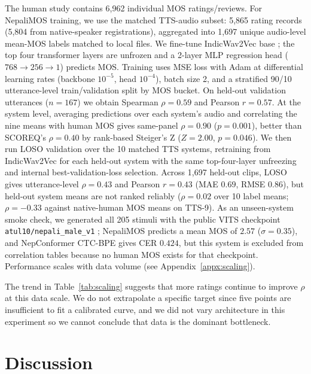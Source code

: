 \documentclass[11pt]{article}
\begin{document}
The human study contains 6{,}962 individual MOS ratings/reviews. For NepaliMOS training, we use the matched TTS-audio subset: 5{,}865 rating records (5{,}804 from native-speaker registrations), aggregated into 1{,}697 unique audio-level mean-MOS labels matched to local files. We fine-tune IndicWav2Vec base \citep{javed2022indicwav2vec}; the top four transformer layers are unfrozen and a 2-layer MLP regression head ($768 \rightarrow 256 \rightarrow 1$) predicts MOS. Training uses MSE loss with Adam at differential learning rates (backbone $10^{-5}$, head $10^{-4}$), batch size 2, and a stratified 90/10 utterance-level train/validation split by MOS bucket. On held-out validation utterances ($n = 167$) we obtain Spearman $\rho = 0.59$ and Pearson $r = 0.57$. At the system level, averaging predictions over each system's audio and correlating the nine means with human MOS gives same-panel $\rho = 0.90$ ($p = 0.001$), better than SCOREQ's $\rho = 0.40$ by rank-based Steiger's Z ($Z=2.00$, $p = 0.046$). We then run LOSO validation over the 10 matched TTS systems, retraining from IndicWav2Vec for each held-out system with the same top-four-layer unfreezing and internal best-validation-loss selection. Across 1{,}697 held-out clips, LOSO gives utterance-level $\rho = 0.43$ and Pearson $r = 0.43$ (MAE $0.69$, RMSE $0.86$), but held-out system means are not ranked reliably ($\rho = 0.02$ over 10 label means; $\rho = -0.33$ against native-human MOS means on TTS-9). As an unseen-system smoke check, we generated all 205 stimuli with the public VITS checkpoint \texttt{atul10/nepali\_male\_v1} \citep{atul102024nepalivits}; NepaliMOS predicts a mean MOS of $2.57$ ($\sigma=0.35$), and NepConformer CTC-BPE gives CER $0.424$, but this system is excluded from correlation tables because no human MOS exists for that checkpoint. Performance scales with data volume (see Appendix~\ref{appx:scaling}).

The trend in Table~\ref{tab:scaling} suggests that more ratings continue to improve $\rho$ at this data scale. We do not extrapolate a specific target since five points are insufficient to fit a calibrated curve, and we did not vary architecture in this experiment so we cannot conclude that data is the dominant bottleneck.

\section{Discussion}
\end{document}
